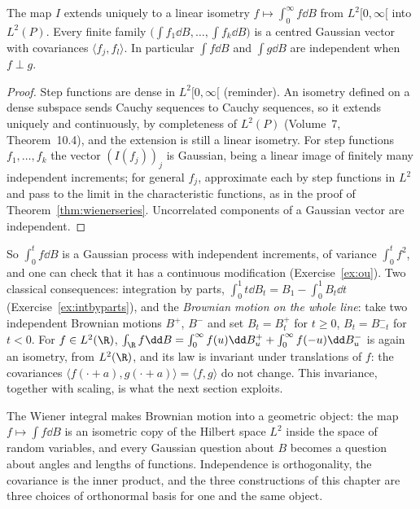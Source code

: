 \begin{theorem}\label{thm:wienerint}
The map $I$ extends uniquely to a linear isometry $f\mapsto\int_0^\infty f\dd B$ from $L^2[0,\infty[$ into $L^2(P)$. Every finite family $\bigl(\int f_1\dd B,\dots,\int f_k\dd B\bigr)$ is a centred Gaussian vector with
covariances $\langle f_j,f_l\rangle$. In particular $\int f\dd B$ and $\int g\dd B$ are independent when $f\perp g$.
\end{theorem}

\begin{proof}
Step functions are dense in $L^2[0,\infty[$ (reminder). An isometry defined on a dense subspace sends Cauchy sequences to Cauchy sequences, so it extends uniquely and continuously, by completeness of $L^2(P)$
(Volume~7, Theorem~10.4), and the extension is still a linear isometry. For step functions $f_1,\dots,f_k$ the vector $(I(f_j))_j$ is Gaussian, being a linear image of finitely many independent increments; for general
$f_j$, approximate each by step functions in $L^2$ and pass to the limit in the characteristic functions, as in the proof of Theorem~\ref{thm:wienerseries}. Uncorrelated components of a Gaussian vector are
independent.
\end{proof}

So $\int_0^tf\dd B$ is a Gaussian process with independent increments, of variance $\int_0^tf^2$, and one can check that it has a continuous modification (Exercise~\ref{ex:ou}). Two classical consequences:
integration by parts, $\int_0^1t\dd B_t=B_1-\int_0^1B_t\dd t$ (Exercise~\ref{ex:intbyparts}), and the \emph{Brownian motion on the whole line}: take two independent Brownian motions $B^+$, $B^-$ and set
$B_t=B^+_t$ for $t\ge0$, $B_t=B^-_{-t}$ for $t<0$. For $f\in L^2(\R)$, $\int_\R f\dd B=\int_0^\infty f(u)\dd B^+_u+\int_0^\infty f(-u)\dd B^-_u$ is again an isometry, from $L^2(\R)$, and its law is invariant under
translations of $f$: the covariances $\langle f(\cdot+a),g(\cdot+a)\rangle=\langle f,g\rangle$ do not change. This invariance, together with scaling, is what the next section exploits.

\begin{beauty}
The Wiener integral makes Brownian motion into a geometric object: the map $f\mapsto\int f\dd B$ is an isometric copy of the Hilbert space $L^2$ inside the space of random variables, and every Gaussian question
about $B$ becomes a question about angles and lengths of functions. Independence is orthogonality, the covariance is the inner product, and the three constructions of this chapter are three choices of orthonormal
basis for one and the same object.
\end{beauty}

